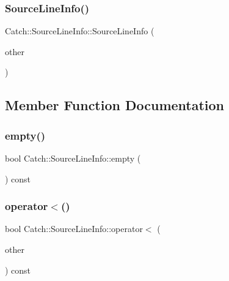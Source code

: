 \hypertarget{struct_catch_1_1_source_line_info_a1ec99cc0547ce5909133aaa8f14ed4b1}{}\label{struct_catch_1_1_source_line_info_a1ec99cc0547ce5909133aaa8f14ed4b1} 
\subsubsection{\texorpdfstring{Source\+Line\+Info()}{SourceLineInfo()}\hspace{0.1cm}{\footnotesize\ttfamily [3/3]}}
{\footnotesize\ttfamily Catch\+::\+Source\+Line\+Info\+::\+Source\+Line\+Info (\begin{DoxyParamCaption}\item[{\hyperlink{struct_catch_1_1_source_line_info}{Source\+Line\+Info} const \&}]{other }\end{DoxyParamCaption})}



\subsection{Member Function Documentation}
\hypertarget{struct_catch_1_1_source_line_info_a05ab6444e9de7e9c3e76d8aa00093c3a}{}\label{struct_catch_1_1_source_line_info_a05ab6444e9de7e9c3e76d8aa00093c3a} 
\subsubsection{\texorpdfstring{empty()}{empty()}}
{\footnotesize\ttfamily bool Catch\+::\+Source\+Line\+Info\+::empty (\begin{DoxyParamCaption}{ }\end{DoxyParamCaption}) const}

\hypertarget{struct_catch_1_1_source_line_info_a8b99a0d7b1553d8c2298c694db924be3}{}\label{struct_catch_1_1_source_line_info_a8b99a0d7b1553d8c2298c694db924be3} 
\subsubsection{\texorpdfstring{operator$<$()}{operator<()}}
{\footnotesize\ttfamily bool Catch\+::\+Source\+Line\+Info\+::operator$<$ (\begin{DoxyParamCaption}\item[{\hyperlink{struct_catch_1_1_source_line_info}{Source\+Line\+Info} const \&}]{other }\end{DoxyParamCaption}) const}


